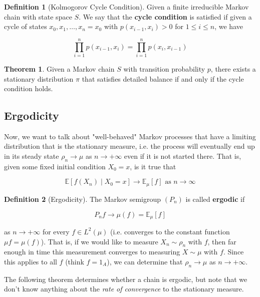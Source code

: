 \documentclass{article}
\theoremstyle{definition}
\newtheorem{theorem}{Theorem}[section]
\theoremstyle{remark}
\theoremstyle{definition}
\newtheorem{definition}{Definition}[section]
\begin{document}
      \begin{definition}[Kolmogorov Cycle Condition]
        Given a finite irreducible Markov chain with state space $S$. We say that the \textbf{cycle condition} is satisfied if given a cycle of states $x_0, x_1, \ldots, x_n = x_0$ with $p(x_{i-1}, x_i) > 0$ for $1 \leq i \leq n$, we have 

          \[\prod_{i=1}^n p(x_{i-1}, x_i) = \prod_{i=1}^n p(x_i, x_{i-1})\]
      \end{definition}

      \begin{theorem}
        Given a Markov chain $S$ with transition probability $p$, there exists a stationary distribution $\pi$ that satisfies detailed balance if and only if the cycle condition holds. 
      \end{theorem}

  \subsection{Ergodicity}

    Now, we want to talk about "well-behaved" Markov processes that have a limiting distribution that is the stationary measure, i.e. the process will eventually end up in its steady state $\rho_n \rightarrow \mu$ as $n \rightarrow +\infty$ even if it is not started there. That is, given some fixed initial condition $X_0 = x$, is it true that 

      \[\mathbb{E}[f(X_n) \mid X_0 = x] \rightarrow \mathbb{E}_\mu [f] \text{ as } n \rightarrow \infty\]

    \begin{definition}[Ergodicity]
      The Markov semigroup $(P_n)$ is called \textbf{ergodic} if 

        \[P_n f \rightarrow \mu(f) = \mathbb{E}_\mu [f]\]

      as $n \rightarrow +\infty$ for every $f \in L^2 (\mu)$ (i.e. converges to the constant function $\mu f = \mu(f)$). That is, if we would like to measure $X_n \sim \rho_n$ with $f$, then far enough in time this measurement converges to measuring $X \sim \mu$ with $f$. Since this applies to all $f$ (think $f = 1_A$), we can determine that $\rho_n \rightarrow \mu$ as $n \rightarrow +\infty$. 
    \end{definition}

    The following theorem determines whether a chain is ergodic, but note that we don't know anything about the \textit{rate of convergence} to the stationary measure. 
\end{document}
